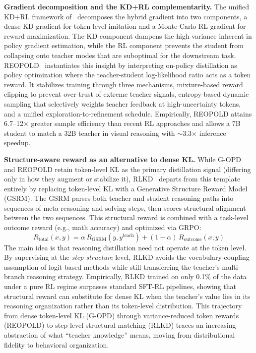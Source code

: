 \documentclass{article} %
\begin{document}
\textbf{Gradient decomposition and the KD+RL complementarity.} The unified KD+RL framework of~\citet{2512.23097} decomposes the hybrid gradient into two components, a dense KD gradient for token-level imitation and a Monte Carlo RL gradient for reward maximization. The KD component dampens the high variance inherent in policy gradient estimation, while the RL component prevents the student from collapsing onto teacher modes that are suboptimal for the downstream task. REOPOLD~\citep{2603.11137} instantiates this insight by interpreting on-policy distillation as policy optimization where the teacher-student log-likelihood ratio acts as a token reward. It stabilizes training through three mechanisms, mixture-based reward clipping to prevent over-trust of extreme teacher signals, entropy-based dynamic sampling that selectively weights teacher feedback at high-uncertainty tokens, and a unified exploration-to-refinement schedule. Empirically, REOPOLD attains 6.7--12$\times$ greater sample efficiency than recent RL approaches and allows a 7B student to match a 32B teacher in visual reasoning with $\sim$3.3$\times$ inference speedup.

\textbf{Structure-aware reward as an alternative to dense KL.} While G-OPD and REOPOLD retain token-level KL as the primary distillation signal (differing only in how they augment or stabilize it), RLKD~\citep{2505.16142} departs from this template entirely by replacing token-level KL with a Generative Structure Reward Model (GSRM). The GSRM parses both teacher and student reasoning paths into sequences of meta-reasoning and solving steps, then scores structural alignment between the two sequences. This structural reward is combined with a task-level outcome reward (e.g., math accuracy) and optimized via GRPO:
\begin{equation*}
    R_{\text{total}}(x, y) = \alpha \, R_{\text{GSRM}}(y, y^{\text{teach}}) + (1-\alpha) \, R_{\text{outcome}}(x, y)
\end{equation*}
The main idea is that reasoning distillation need not operate at the token level. By supervising at the \emph{step structure} level, RLKD avoids the vocabulary-coupling assumption of logit-based methods while still transferring the teacher's multi-branch reasoning strategy. Empirically, RLKD trained on only 0.1\% of the data under a pure RL regime surpasses standard SFT-RL pipelines, showing that structural reward can substitute for dense KL when the teacher's value lies in its reasoning organization rather than its token-level distribution. This trajectory from dense token-level KL (G-OPD) through variance-reduced token rewards (REOPOLD) to step-level structural matching (RLKD) traces an increasing abstraction of what ``teacher knowledge'' means, moving from distributional fidelity to behavioral organization.
\end{document}
